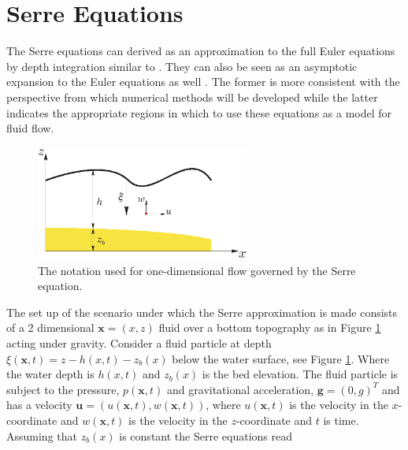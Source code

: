 \documentclass[SingleSpace,12pt]{Serre_ASCE}
\begin{document}
\section{Serre Equations}
\label{section:Serre Equations}
The Serre equations can derived as an approximation to the full Euler equations by depth integration similar to \cite{Su-Gardener-1969-536}. They can also be seen as an asymptotic expansion to the Euler equations as well \cite{Bonneton-Lannes-2009-16601}. The former is more consistent with the perspective from which numerical methods will be developed while the latter indicates the appropriate regions in which to use these equations as a model for fluid flow.
\begin{figure}[htb]
\begin{center}
\includegraphics[width=7.0cm]{one-dimensional-axis_Serre.eps}
\end{center}
\caption{The notation used for one-dimensional flow governed by the Serre equation.}
\label{fig:Notation}
\end{figure}
The set up of the scenario under which the Serre approximation is made consists of a 2 dimensional $\textbf{x} = (x,z)$ fluid over a bottom topography as in Figure \ref{fig:Notation} acting under gravity. Consider a fluid particle at depth  $\xi(\textbf{x},t) = z - h(x,t) - z_b(x)$ below the water surface, see Figure \ref{fig:Notation}. Where the water depth is $h(x,t)$ and $z_b(x)$ is the bed elevation. The fluid particle is subject to the pressure, $p(\textbf{x},t)$ and  gravitational acceleration, $\textbf{g} = (0,g)^T$ and has a velocity $\textbf{u} = (u(\textbf{x},t),w(\textbf{x},t))$,  where $u(\textbf{x},t)$ is the velocity in the $x$-coordinate and $w(\textbf{x},t)$ is the velocity in the $z$-coordinate and $t$ is time. Assuming that $z_b(x)$ is constant the Serre equations read \cite{Guyenne-etal-2014-169}
\end{document}
